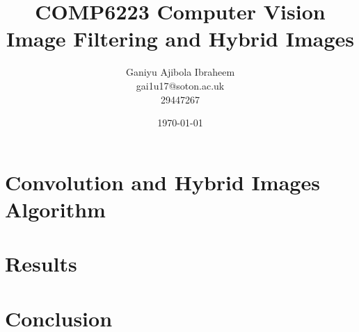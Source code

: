 \documentclass[a4paper,12pt]{article}
\begin{document}
	
\begin{titlepage}
	\title{
		COMP6223 Computer Vision \\
		\large Image Filtering and Hybrid Images
	}
	\date{\today}
	\author{
		Ganiyu Ajibola Ibraheem \\
		\large gai1u17@soton.ac.uk \\
			29447267
	}
\end{titlepage}

\maketitle
\newpage
{}
\tableofcontents
\newpage
\listoffigures
\listoftables
\listoflistings
\newpage
{}


\section{Convolution and Hybrid Images Algorithm}
\section{Results}
\section{Conclusion}
\end{document}
